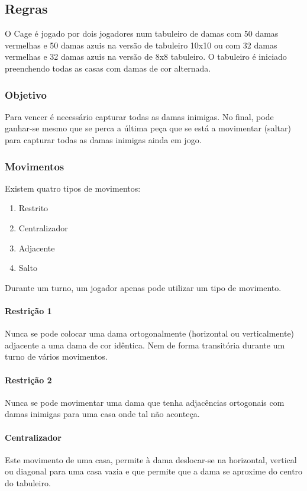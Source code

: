 \documentclass[a4paper]{article}
\begin{document}
\subsection{Regras}
O Cage é jogado por dois jogadores num tabuleiro de damas com 50 damas vermelhas e 50 damas azuis na versão de tabuleiro 10x10 ou com 32 damas vermelhas e 32 damas azuis na versão de 8x8 tabuleiro. O tabuleiro é iniciado preenchendo todas as casas com damas de cor alternada.

\subsubsection{Objetivo}
Para vencer é necessário capturar todas as damas inimigas. No final, pode ganhar-se mesmo que se perca a última peça que se está a movimentar (saltar) para capturar todas as damas inimigas ainda em jogo.

\subsubsection{Movimentos}
Existem quatro tipos de movimentos:
\begin{enumerate}
  \item Restrito
  \item Centralizador
  \item Adjacente
  \item Salto
\end{enumerate}
Durante um turno, um jogador apenas pode utilizar um tipo de movimento.

\paragraph{Restrição 1}
Nunca se pode colocar uma dama ortogonalmente (horizontal ou verticalmente) adjacente a uma dama de cor idêntica. Nem de forma transitória durante um turno de vários movimentos.

\paragraph{Restrição 2}
Nunca se pode movimentar uma dama que tenha adjacências ortogonais com damas inimigas para uma casa onde tal não aconteça.

\paragraph{Centralizador}
Este movimento de uma casa, permite à dama deslocar-se na horizontal, vertical ou diagonal para uma casa vazia e que permite que a dama se aproxime do centro do tabuleiro.
\end{document}
